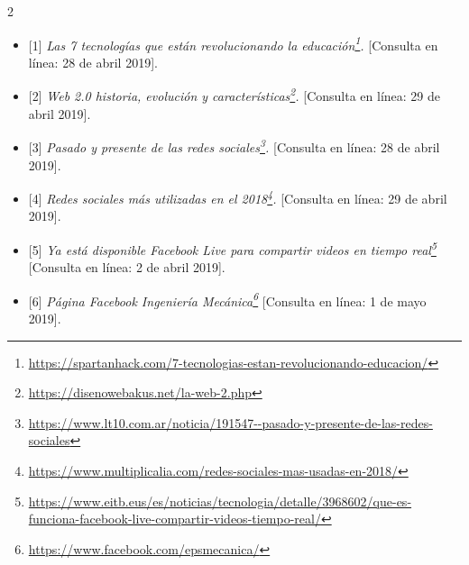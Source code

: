 \documentclass[11pt,spanish,Letterpaper,openany]{book}
\let\rmarkdownfootnote\footnote%
\def\footnote{\protect\rmarkdownfootnote}
\begin{document}
\begin {multicols}{2}
\begin{itemize}
\item
  {[}1{]} \emph{Las 7 tecnologías que están revolucionando la educación\footnote{\url{https://spartanhack.com/7-tecnologias-estan-revolucionando-educacion/}}.} {[}Consulta en línea: 28 de abril 2019{]}.
\item
  {[}2{]} \emph{Web 2.0 historia, evolución y características\footnote{\url{https://disenowebakus.net/la-web-2.php}}.} {[}Consulta en línea: 29 de abril 2019{]}.
\item
  {[}3{]} \emph{Pasado y presente de las redes sociales\footnote{\url{https://www.lt10.com.ar/noticia/191547--pasado-y-presente-de-las-redes-sociales}}.} {[}Consulta en línea: 28 de abril 2019{]}.
\item
  {[}4{]} \emph{Redes sociales más utilizadas en el 2018\footnote{\url{https://www.multiplicalia.com/redes-sociales-mas-usadas-en-2018/}}.} {[}Consulta en línea: 29 de abril 2019{]}.
\item
  {[}5{]} \emph{Ya está disponible Facebook Live para compartir videos en tiempo real\footnote{\url{https://www.eitb.eus/es/noticias/tecnologia/detalle/3968602/que-es-funciona-facebook-live-compartir-videos-tiempo-real/}}} {[}Consulta en línea: 2 de abril 2019{]}.
\item
  {[}6{]} \emph{Página Facebook Ingeniería Mecánica\footnote{\url{https://www.facebook.com/epsmecanica/}}} {[}Consulta en línea: 1 de mayo 2019{]}.
\end{itemize}

\end {multicols}




\end{document}
